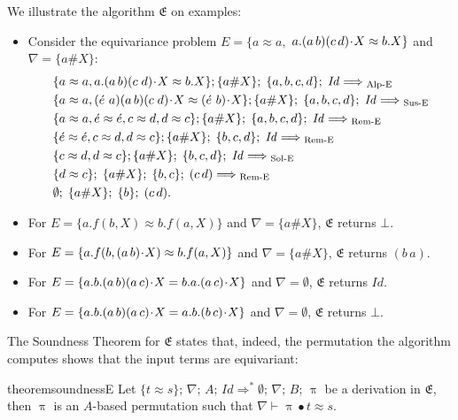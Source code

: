 \documentclass{llncs}
\newcommand{\Lra}{\Longrightarrow}
\newcommand{\swap}[2]{\ensuremath{(#1\, #2)}}
\newcommand{\idp}{\mathit{Id}}
\newcommand{\perm}{\approx}
\newcommand{\permap}{{\mkern 1mu\cdot \mkern 1mu}}
\newcommand{\permef}{\bullet}
\newcommand\ppi{\uppi}
\newcommand{\msys}{\mathfrak{E}}
\newcommand{\fresh}[1]{{\acute{#1}}}
\newcommand{\Atoms}{A}
\newcommand{\nablai}{{\nabla}}
\begin{document}
\begin{example}\label{exmp:equiv}
  We illustrate the algorithm $\msys$ on examples:
\begin{itemize}
\item
  Consider the equivariance problem $E= \{a \perm a, $ $a.\swap{a}{b}(c\,d)\permap X\perm 
\allowbreak b.X\}$ and $\nablai=\{a\#X\}$:
 \begin{alignat*}{3}
   &  \{a \perm a, a.\swap{a}{b}(c\;d)\permap X\perm\allowbreak b.X\} ; \{a\#X\} ;\; \{a,b,c,d\} ;\;\idp  \Lra_{\text{ Alp-E}}{} \\
  &  \{a \perm a, \swap{\fresh{e}\,}{a}\swap{a}{b}(c\;d)\permap X\perm\allowbreak \swap{\fresh{e}\,}{b}\permap X\} ;\{a\#X\} ;\; \{a,b,c,d\} ;\; \idp \Lra_{\text{ Sus-E}} \\
  & \{a \perm a,\fresh{e}\perm\fresh{e},c\perm d, d\perm c \} ;\{a\#X\} ;\; \{a,b,c,d\} ;\; \idp \Lra_{\text{ Rem-E}}{}\\
  & \{\fresh{e}\perm\fresh{e},c\perm d, d\perm c \}; \{a\#X\} ;\; \{b,c,d\} ;\;\idp \Lra_{\text{ Rem-E}}{}\\
  & \{c\perm d, d\perm c \};\{a\#X\} ;\; \{b,c,d\} ;\;\idp \Lra_{\text{ Sol-E}}\\
  & \{d\perm c \} ;\; \{a\#X\} ;\; \{b,c\} ;\; \swap{c}{d} \Lra_{\text{ Rem-E}}\\
  &  \emptyset ;\; \{a\#X\} ;\; \{b\} ;\;\swap{c}{d}.
\end{alignat*}
  \item For $E=\{a.f(b,X) \perm b.f(a,X)\}$ and $\nablai=\{a\#X\}$, $\msys$ returns $\bot$.
  \item For $E=\{a.f(b,\swap{a}{b}\permap X) \perm b.f(a,X)\} $ and $\nablai=\{a\#X\}$, $\msys$ returns $(b\,a)$.
  \item For $E=\{a.b.\swap{a}{b}\swap{a}{c}\permap X =  b.a. \swap{a}{c}\permap X\}$ and $\nabla=\emptyset$, $\msys$ returns $\idp$.
  \item For $E=\{a.b.\swap{a}{b}\swap{a}{c}\permap X =  a.b. (b\, c)\permap X\}$ and $\nabla=\emptyset$, $\msys$ returns $\bot$.
  \end{itemize}
\end{example}


The Soundness Theorem for $\msys$ states that, indeed, the permutation
the algorithm computes shows that the input terms are equivariant:

\begin{restatable}[Soundness of $\msys$]{theorem}{soundnessE} \label{thm:soundness:equiv}
Let $ \{t\perm s\} ;\,\allowbreak \nablai ;\,\allowbreak \Atoms
;\,\allowbreak \idp \Lra^* \emptyset ;\, \nablai;\, B ;\, \ppi$ be a
derivation in $\msys$, then $\ppi$ is an $\Atoms$-based permutation
such that $\nablai\vdash \ppi\permef t\approx s$.
\end{restatable}
\end{document}
